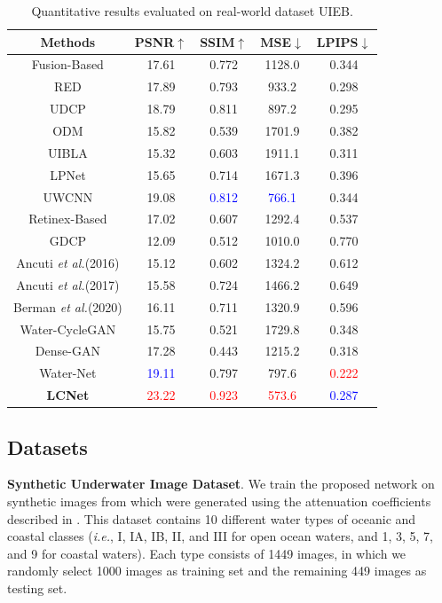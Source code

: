 \documentclass[journal]{IEEEtran}
\begin{document}
\begin{table}[h]
\caption{Quantitative results evaluated on real-world dataset UIEB. }
\centering
\begin{tabular}{|c|c|c|c|c|} 
\hline
Methods&PSNR\(\uparrow\)&SSIM\(\uparrow\)&MSE\(\downarrow\)&LPIPS\(\downarrow\)\\
\hline
Fusion-Based \cite{fusion-based} &17.61 &0.772 &1128.0&0.344 \\
\hline 
RED \cite{RED} &17.89 &0.793 &933.2&0.298 \\
\hline 
UDCP \cite{UDCP} &18.79 &0.811 &897.2&0.295 \\
\hline 
ODM \cite{Histogram-prior} &15.82&0.539&1701.9&0.382\\
\hline
UIBLA \cite{blurriness-based} &15.32&0.603&1911.1&0.311\\
\hline
LPNet \cite{fu2019lightweight} &15.65 &0.714 &1671.3&0.396 \\
\hline 
UWCNN \cite{uwcnn} &19.08 &\textcolor{blue}{0.812}&\textcolor{blue}{766.1}&0.344 \\
\hline
Retinex-Based \cite{fu2014retinex} &17.02&0.607&1292.4&0.537\\
\hline 
GDCP \cite{GDCP} &12.09 &0.512 &1010.0&0.770\\
\hline
Ancuti \textit{et al.}(2016) \cite{ancuti2016multi} &15.12 &0.602&1324.2&0.612 \\
\hline
Ancuti \textit{et al.}(2017) \cite{ancuti2017color} &15.58 &0.724&1466.2&0.649 \\
\hline
Berman \textit{et al.}(2020) \cite{berman2020underwater} &16.11 &0.711&1320.9&0.596 \\
\hline
Water-CycleGAN \cite{water-gan} &15.75&0.521&1729.8&0.348\\
\hline
Dense-GAN \cite{dense-gan}&17.28&0.443&1215.2&0.318\\
\hline
Water-Net \cite{water-net} &\textcolor{blue}{19.11}&0.797&797.6&\textcolor{red}{0.222}\\
\hline
\textbf{LCNet}&\textcolor{red}{23.22}&\textcolor{red}{0.923}&\textcolor{red}{573.6}&\textcolor{blue}{0.287}\\
\hline 
\end{tabular}

\label{tab3} 
\end{table}




\subsection{Datasets}
\textbf{Synthetic Underwater Image Dataset}. We train the proposed network on synthetic images from \cite{uwcnn} which were generated using the attenuation coefficients described in \cite{berman2017diving}. This dataset contains 10 different water types of oceanic and coastal classes (\textit{i.e.}, I, IA, IB, II, and III for open ocean waters, and 1, 3, 5, 7, and 9 for coastal waters). Each type consists of 1449 images, in which we randomly select 1000 images as training set and the remaining 449 images as testing set.
\end{document}
